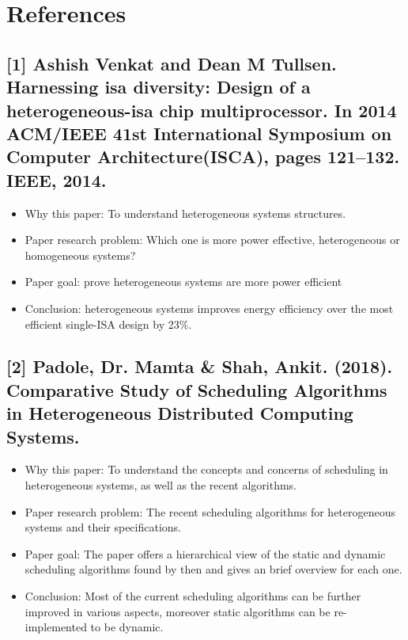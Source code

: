 \documentclass[twocolumn,11pt]{IEEEtran}
\begin{document}
    \section{References}
    \subsection*{[1] Ashish Venkat and Dean M Tullsen. Harnessing isa diversity: Design  of  a  heterogeneous-isa  chip  multiprocessor. In 2014 ACM/IEEE 41st International Symposium on Computer Architecture(ISCA), pages 121–132. IEEE, 2014.}
    \begin{itemize}
        \item Why this paper: To understand heterogeneous systems structures.
        \item Paper research problem: Which one is more power effective, heterogeneous or homogeneous systems?
        \item Paper goal: prove heterogeneous systems are more power efficient
        \item Conclusion: heterogeneous systems improves energy efficiency over the most efficient single-ISA design by 23\%.
    \end{itemize} 
    
     \subsection*{[2] Padole, Dr. Mamta \& Shah, Ankit. (2018). Comparative Study of Scheduling Algorithms in Heterogeneous Distributed Computing Systems.}
    \begin{itemize}
        \item Why this paper: To understand the concepts and concerns of scheduling in heterogeneous systems, as well as the recent algorithms.
        \item Paper research problem: The recent scheduling algorithms for heterogeneous systems and their specifications.
        \item Paper goal: The paper offers a hierarchical view of the static and dynamic scheduling algorithms found by then and gives an brief overview for each one. 
        \item Conclusion: Most of the current scheduling algorithms can be further improved in various aspects, moreover static algorithms can be re-implemented to be dynamic.
    \end{itemize} 
    
\end{document}
